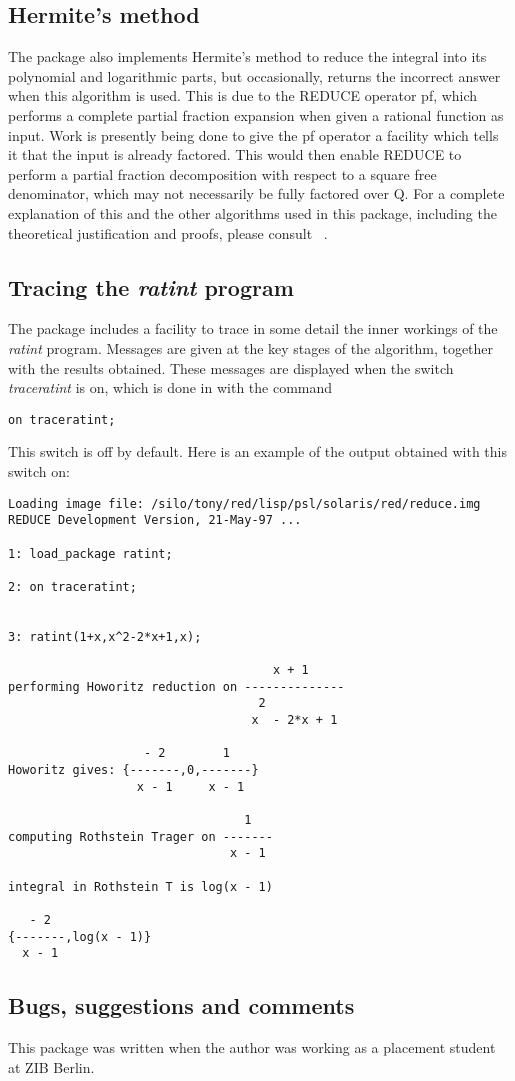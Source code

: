 \subsection{Hermite's method}
The package also implements Hermite's method to reduce the integral into its polynomial and logarithmic parts, but occasionally, \REDUCE returns the incorrect answer when this algorithm is used. This is due to the REDUCE operator pf, which performs a complete partial fraction expansion when given a rational function as input. Work is presently being done to give the pf operator a facility which tells it that the input is already factored. This would then enable REDUCE to perform a partial fraction decomposition with respect to a square free denominator, which may not necessarily be fully factored over Q. 
\newline
For a complete explanation of this and the other algorithms used in this package, including the theoretical justification and proofs, please consult ~\cite{Geddes:92}.

\subsection{Tracing the \emph{ratint} program}
The package includes a facility to trace in some detail the inner workings of the \emph{ratint} program. Messages are given at the key stages of the algorithm, together with the results obtained. These messages are displayed when the switch \emph{traceratint} is on, which is done in \REDUCE with the command 
\begin{verbatim}
on traceratint;
\end{verbatim}
This switch is off by default. Here is an example of the output obtained with this switch on:

\begin{verbatim}
Loading image file: /silo/tony/red/lisp/psl/solaris/red/reduce.img
REDUCE Development Version, 21-May-97 ...

1: load_package ratint;

2: on traceratint;


3: ratint(1+x,x^2-2*x+1,x);

                                     x + 1
performing Howoritz reduction on --------------
                                   2
                                  x  - 2*x + 1

                   - 2        1
Howoritz gives: {-------,0,-------}
                  x - 1     x - 1

                                 1
computing Rothstein Trager on -------
                               x - 1

integral in Rothstein T is log(x - 1)

   - 2
{-------,log(x - 1)}
  x - 1

\end{verbatim}

\subsection{Bugs, suggestions and comments}
This package was written when the author was working as a placement student at ZIB Berlin.

